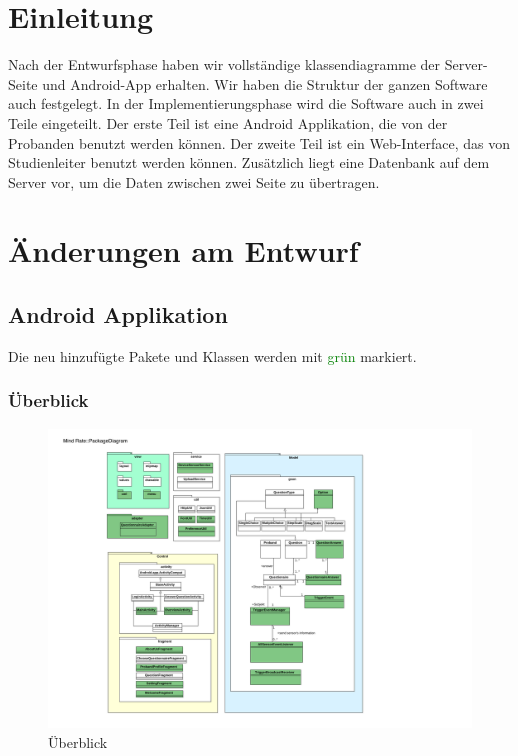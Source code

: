 \documentclass[a4paper]{scrreprt}
\begin{document}
    \tableofcontents

    \chapter{Einleitung}

        Nach der Entwurfsphase haben wir vollständige klassendiagramme der Server-Seite und Android-App erhalten. Wir haben die Struktur der ganzen Software auch festgelegt. In der Implementierungsphase wird die Software auch in zwei Teile eingeteilt. Der erste Teil ist eine Android Applikation, die von der Probanden benutzt werden können. Der zweite Teil ist ein Web-Interface, das von Studienleiter benutzt werden können. Zusätzlich liegt eine Datenbank auf dem Server vor, um die Daten zwischen zwei Seite zu übertragen.





    \newpage
    \chapter{Änderungen am Entwurf}


        \section{Android Applikation}

            Die neu hinzufügte Pakete und Klassen werden mit \textcolor{green}{grün} markiert.

            \subsection{Überblick}

                \begin{figure}[H]
                    \centering
                    \includegraphics[scale = 1.0]{PackageDiagram.pdf}
                    \caption{Überblick}
                \end{figure}
\end{document}
